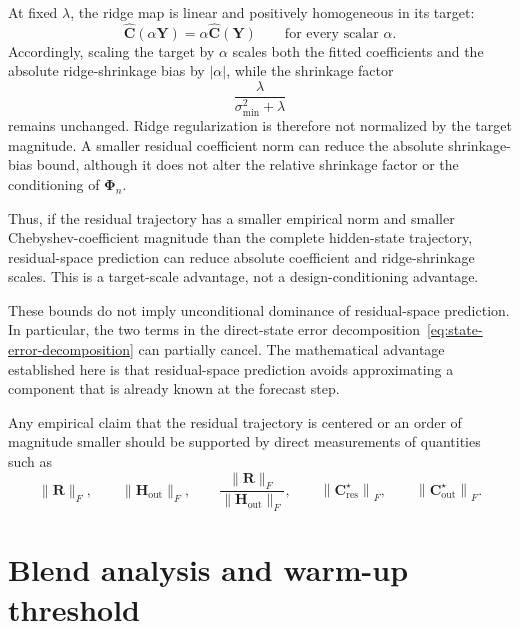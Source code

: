 At fixed $\lambda$, the ridge map is linear and positively homogeneous
in its target:
\begin{equation}
\widehat{\mathbf{C}}(\alpha\mathbf{Y})
=
\alpha
\widehat{\mathbf{C}}(\mathbf{Y})
\qquad
\text{for every scalar }\alpha.
\label{eq:ridge-positive-homogeneity}
\end{equation}
Accordingly, scaling the target by $\alpha$ scales both the fitted
coefficients and the absolute ridge-shrinkage bias by $|\alpha|$, while
the shrinkage factor
\begin{equation}
\frac{\lambda}{\sigma_{\min}^2+\lambda}
\end{equation}
remains unchanged. Ridge regularization is therefore not normalized by
the target magnitude. A smaller residual coefficient norm can reduce
the absolute shrinkage-bias bound, although it does not alter the
relative shrinkage factor or the conditioning of
$\mathbf{\Phi}_n$.

Thus, if the residual trajectory has a smaller empirical norm and
smaller Chebyshev-coefficient magnitude than the complete hidden-state
trajectory, residual-space prediction can reduce absolute coefficient
and ridge-shrinkage scales. This is a target-scale advantage, not a
design-conditioning advantage.

These bounds do not imply unconditional dominance of residual-space
prediction. In particular, the two terms in the direct-state error
decomposition~\eqref{eq:state-error-decomposition} can partially
cancel. The mathematical advantage established here is that
residual-space prediction avoids approximating a component that is
already known at the forecast step.

Any empirical claim that the residual trajectory is centered or an
order of magnitude smaller should be supported by direct measurements
of quantities such as
\begin{equation}
\|\mathbf{R}\|_F,
\qquad
\|\mathbf{H}_{\mathrm{out}}\|_F,
\qquad
\frac{
\|\mathbf{R}\|_F
}{
\|\mathbf{H}_{\mathrm{out}}\|_F
},
\qquad
\left\|
\mathbf{C}_{\mathrm{res}}^\star
\right\|_F,
\qquad
\left\|
\mathbf{C}_{\mathrm{out}}^\star
\right\|_F.
\label{eq:residual-scale-measurements}
\end{equation}
\section{Blend analysis and warm-up threshold}
\label{app:blend}

